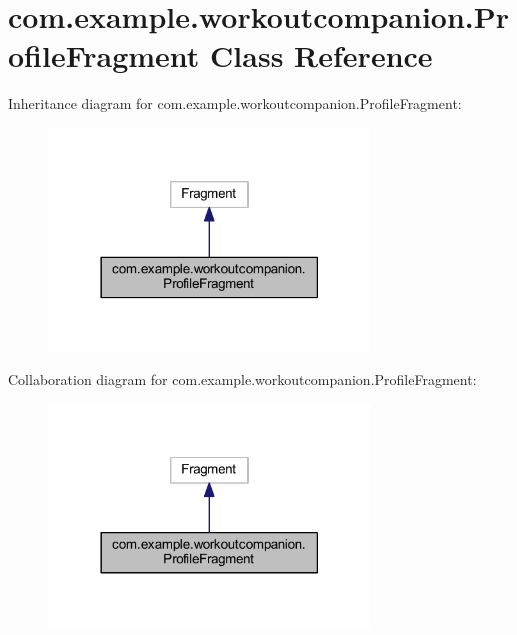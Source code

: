\hypertarget{classcom_1_1example_1_1workoutcompanion_1_1_profile_fragment}{\section{com.\-example.\-workoutcompanion.\-Profile\-Fragment Class Reference}
\label{classcom_1_1example_1_1workoutcompanion_1_1_profile_fragment}
}


Inheritance diagram for com.\-example.\-workoutcompanion.\-Profile\-Fragment\-:
\nopagebreak
\begin{figure}[H]
\begin{center}
\leavevmode
\includegraphics[width=242pt]{classcom_1_1example_1_1workoutcompanion_1_1_profile_fragment__inherit__graph}
\end{center}
\end{figure}


Collaboration diagram for com.\-example.\-workoutcompanion.\-Profile\-Fragment\-:
\nopagebreak
\begin{figure}[H]
\begin{center}
\leavevmode
\includegraphics[width=242pt]{classcom_1_1example_1_1workoutcompanion_1_1_profile_fragment__coll__graph}
\end{center}
\end{figure}
